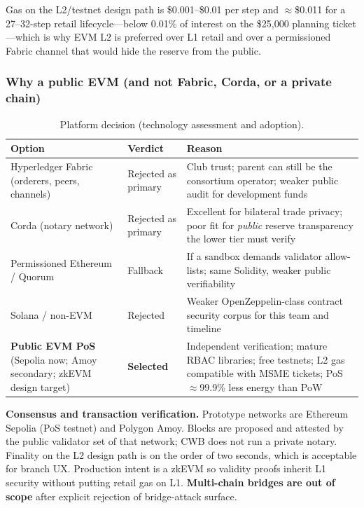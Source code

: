 \documentclass[11pt,a4paper]{article}
\newcommand{\tablehead}{\rowcolor{HeadShade}\bfseries}
\begin{document}
Gas on the L2/testnet design path is \$0.001--\$0.01 per step and $\approx$\$0.011 for a 27--32-step retail lifecycle---below 0.01\% of interest on the \$25{,}000 planning ticket---which is why EVM L2 is preferred over L1 retail and over a permissioned Fabric channel that would hide the reserve from the public.

\subsubsection{Why a public EVM (and not Fabric, Corda, or a private chain)}

\begin{table}[H]
\centering
\small
\caption{Platform decision (technology assessment and adoption).}
\label{tab:platform}
\begin{tabular}{@{}>{\raggedright\arraybackslash}p{3.1cm}>{\raggedright\arraybackslash}p{4.4cm}>{\raggedright\arraybackslash}p{6.3cm}@{}}
\toprule
\tablehead Option & Verdict & Reason \\
\midrule
Hyperledger Fabric (orderers, peers, channels) & Rejected as primary & Club trust; parent can still be the consortium operator; weaker public audit for development funds \\
\rowcolor{RowShade}
Corda (notary network) & Rejected as primary & Excellent for bilateral trade privacy; poor fit for \textit{public} reserve transparency the lower tier must verify \\
Permissioned Ethereum / Quorum & Fallback & If a sandbox demands validator allow-lists; same Solidity, weaker public verifiability \\
\rowcolor{RowShade}
Solana / non-EVM & Rejected & Weaker OpenZeppelin-class contract security corpus for this team and timeline \\
\textbf{Public EVM PoS} (Sepolia now; Amoy secondary; zkEVM design target) & \textbf{Selected} & Independent verification; mature RBAC libraries; free testnets; L2 gas compatible with MSME tickets; PoS $\approx$99.9\% less energy than PoW \\
\bottomrule
\end{tabular}
\end{table}

\textbf{Consensus and transaction verification.} Prototype networks are Ethereum Sepolia (PoS testnet) and Polygon Amoy. Blocks are proposed and attested by the public validator set of that network; CWB does not run a private notary. Finality on the L2 design path is on the order of two seconds, which is acceptable for branch UX. Production intent is a zkEVM so validity proofs inherit L1 security without putting retail gas on L1. \textbf{Multi-chain bridges are out of scope} after explicit rejection of bridge-attack surface.
\end{document}
